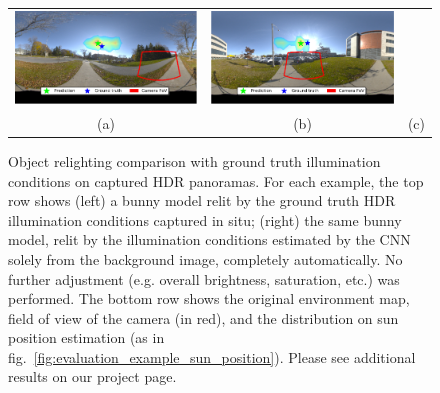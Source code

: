\begin{figure}[t]
\begin{tabular}{cccccc}
    \multicolumn{2}{c}{
    \includegraphics[width=\RndrWdth]{./figures/valid/panos/AG8A2791_Panorama_hdr-corrected_exr-3_png.pdf}} &
    \multicolumn{2}{c}{
    \includegraphics[width=\RndrWdth]{./figures/valid/panos/AG8A3169_Panorama_hdr-corrected_exr-5_png.pdf}} \\
    \multicolumn{2}{c}{(a)} & \multicolumn{2}{c}{(b)} & \multicolumn{2}{c}{(c)}
    \end{tabular}
    \caption[Object relighting comparison with ground truth illumination conditions on HDR panoramas]{Object relighting comparison with ground truth illumination conditions on captured HDR panoramas. For each example, the top row shows (left) a bunny model relit by the ground truth HDR illumination conditions captured in situ; (right) the same bunny model, relit by the illumination conditions estimated by the CNN solely from the background image, completely automatically. No further adjustment (e.g. overall brightness, saturation, etc.) was performed. The bottom row shows the original environment map, field of view of the camera (in red), and the distribution on sun position estimation (as in fig.~\ref{fig:evaluation_example_sun_position}). Please see additional results on our project page.}
    \label{fig:hdr-panoramas-validation}
    \vspace{-1em}
\end{figure}

